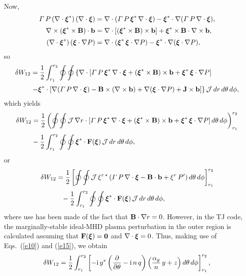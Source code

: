 \documentclass[12pt,prb,aps]{revtex4-1}
\newcommand {\bxi}{\mbox{\boldmath$\xi$}}
\begin{document}
Now,
\begin{align}
{\mit\Gamma}\,P\,(\nabla\cdot\bxi^\ast)\,(\nabla\cdot\bxi)&=\nabla\cdot({\mit\Gamma}\,P\,\bxi^\ast\,\nabla\cdot\bxi)-\bxi^\ast\cdot\nabla(
{\mit\Gamma}\,P\,\nabla\cdot\bxi),\\[0.5ex]
 \nabla\times (\bxi^\ast\times {\bf B})\cdot {\bf b}&= \nabla\cdot[(\bxi^\ast\times {\bf B})\times {\bf b}] + \bxi^\ast\times {\bf B}\cdot\nabla\times {\bf b},\\[0.5ex]
 (\nabla\cdot\bxi^\ast)\,(\bxi\cdot\nabla P)&=\nabla\cdot(\bxi^\ast\,\bxi\cdot\nabla P) -\bxi^\ast\cdot\nabla(\bxi\cdot\nabla P),
\end{align}
so
\begin{align}
\delta W_{12} &= \frac{1}{2}\int_{r_1}^{r_2}\oint\oint\left\{\nabla\cdot[{\mit\Gamma}\,P\,\bxi^\ast\,\nabla\cdot\bxi+ (\bxi^\ast\times {\bf B})\times {\bf b}+\bxi^\ast\,\bxi\cdot\nabla P]\right.\nonumber\\[0.5ex]&\left.-\bxi^\ast\cdot[ \nabla({\mit\Gamma}\,P\,\nabla\cdot\bxi) - {\bf B}\times(\nabla\times {\bf b})+\nabla(\bxi\cdot\nabla P)+{\bf J}\times  {\bf b}]\right\}{\cal J}\,dr\,d\theta\,d\phi,
\end{align}
which yields
\begin{align}
\delta W_{12} &= \frac{1}{2}\left(\oint\oint{\cal J}\,\nabla r\cdot[{\mit\Gamma}\,P\,\bxi^\ast\,\nabla\cdot\bxi+ (\bxi^\ast\times {\bf B})\times {\bf b}+\bxi^\ast\,\bxi\cdot\nabla P]\,d\theta\,d\phi\right)_{r_1}^{r_2}\nonumber\\[0.5ex]
&-\frac{1}{2}\int_{r_1}^{r_2}\oint\oint \bxi^\ast\cdot{\bf F}(\bxi)\,{\cal J}\,dr\,d\theta\,d\phi,
\end{align}
or
\begin{align}
\delta W_{12} &= \frac{1}{2}\left[\oint\oint{\cal J}\,\xi^{r\,\ast}\,({\mit\Gamma}\,P\,\nabla\cdot\bxi -{\bf B}\cdot{\bf b} + \xi^r\,P')\,d\theta\,d\phi\right]_{r_1}^{r_2}\nonumber\\[0.5ex]&\phantom{=}-\frac{1}{2}\int_{r_1}^{r_2}\oint\oint\bxi^\ast\cdot{\bf F}(\bxi)\,{\cal J}\,dr\,d\theta\,d\phi,
\end{align}
where use has been made of the fact that ${\bf B}\cdot\nabla r = 0$.  However, in the TJ code, the marginally-stable ideal-MHD  plasma perturbation in the outer region is calculated assuming that ${\bf F}(\bxi)={\bf 0}$ and
$\nabla\cdot\bxi=0$.\cite{tj}   Thus, making use of Eqs.~(\ref{e10}) and (\ref{e15}), we obtain 
\begin{equation}
\delta W_{12} = \frac{1}{2}\int_{r_1}^{r_2}\left[-{\rm i}\,y^\ast\left(\frac{\partial}{\partial\theta}-{\rm i}\,n\,q\right)\left(\frac{\alpha_g}{n}\,y+z\right)d\theta\,d\phi\right]_{r_1}^{r_2},
\end{equation}
\end{document}
